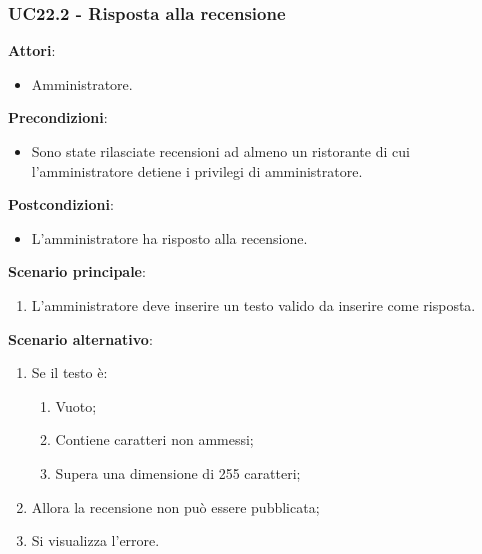 \subsubsection{UC22.2 - Risposta alla recensione}\label{usecase:22_2}
\textbf{Attori}:
\begin{itemize}
    \item Amministratore.
\end{itemize}
\textbf{Precondizioni}:
\begin{itemize}
    \item Sono state rilasciate recensioni ad almeno un ristorante di cui l'amministratore detiene i privilegi di amministratore.
\end{itemize}
\textbf{Postcondizioni}:
\begin{itemize}
    \item L'amministratore ha risposto alla recensione.
\end{itemize}
\textbf{Scenario principale}:
\begin{enumerate}
    \item L'amministratore deve inserire un testo valido da inserire come risposta.
\end{enumerate}
\textbf{Scenario alternativo}:
\begin{enumerate}
    \item Se il testo è: 
    \begin{enumerate}
        \item Vuoto;
        \item Contiene caratteri non ammessi;
        \item Supera una dimensione di 255 caratteri;
    \end{enumerate}
    \item Allora la recensione non può essere pubblicata;
    \item Si visualizza l'errore.
\end{enumerate}